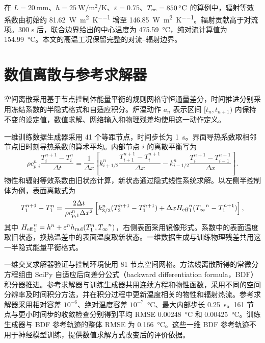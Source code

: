 在 $L=\SI{20}{\milli\metre}$、$h=\SI{25}{\watt\per\square\metre\per\kelvin}$、$\varepsilon=0.75$、$\Tinfty=\SI{850}{\degreeCelsius}$ 的算例中，辐射等效系数由初始约 \SI{81.62}{\watt\per\square\metre\per\kelvin} 增至 \SI{146.85}{\watt\per\square\metre\per\kelvin}。辐射贡献高于对流项。300 s 后，联合边界给出的中心温度为 \SI{475.59}{\degreeCelsius}，纯对流计算值为 \SI{154.99}{\degreeCelsius}。本文的高温工况保留完整的对流--辐射边界。

\section{数值离散与参考求解器}
\label{sec:physical-discretization}

空间离散采用基于节点控制体能量平衡的规则网格守恒通量差分，时间推进分别采用冻结系数的半隐式格式和自适应积分。炉温动作 $a_n$ 表示区间 $[t_n,t_{n+1})$ 内保持不变的设定值，数值求解、网络输入和物理残差均使用这一动作定义。

一维训练数据生成器采用 41 个等距节点，时间步长为 \SI{1}{\second}。界面导热系数取相邻节点旧时刻导热系数的算术平均。内部节点 $i$ 的离散平衡写为
\begin{equation}
  \rho c_{p,i}^{n}\frac{T_i^{n+1}-T_i^n}{\Delta t}
  =\frac{1}{\Delta x}
  \left[
    k_{i+1/2}^{n}\frac{T_{i+1}^{n+1}-T_i^{n+1}}{\Delta x}
    -k_{i-1/2}^{n}\frac{T_i^{n+1}-T_{i-1}^{n+1}}{\Delta x}
  \right].
  \label{eq:discrete_balance}
\end{equation}
物性和辐射等效系数由旧状态计算，新状态通过隐式线性系统求解。以左侧半控制体为例，表面离散式为
\begin{equation}
  T_1^{n+1}-T_1^n
  =\frac{2\Delta t}{\rho c_{p,1}^{n}\Delta x^2}
  \left[
    k_{3/2}^{n}(T_2^{n+1}-T_1^{n+1})
    +\Delta x{H_{\mathrm{eff}}}_1^n({T_{\infty}}^n-T_1^{n+1})
  \right],
  \label{eq:surface_discrete_balance}
\end{equation}
其中 ${H_{\mathrm{eff}}}_1^n=h^n+\varepsilon^nh_{\mathrm{rad}}(T_1^n,{T_{\infty}}^n)$，右侧表面采用镜像形式。系数中的表面温度取旧状态，换热温差中的表面温度取新状态。一维数据生成与训练物理残差共用这一半隐式能量平衡格式。

一维交叉求解器验证与控制环境使用 81 节点空间网格。方法线离散所得的常微分方程组由 SciPy 自适应后向差分公式（backward differentiation formula，BDF）积分器推进。参考求解器与训练生成器共用连续方程和物性函数，采用不同的空间分辨率及时间积分方法，并在积分过程中更新温度相关的物性和辐射热流。参考求解器采用相对容差 $10^{-6}$、绝对温度容差 $10^{-7}$~\si{\degreeCelsius}、最大内部步长 \SI{0.25}{\second}。161 节点与更小时间步的收敛检查分别得到平均 RMSE \SI{0.00248}{\degreeCelsius} 和 \SI{0.00425}{\degreeCelsius}。训练生成器与 BDF 参考轨迹的整体 RMSE 为 \SI{0.166}{\degreeCelsius}。这些一维 BDF 参考轨迹不用于神经模型训练，提供数值求解方式改变后的评价依据。

